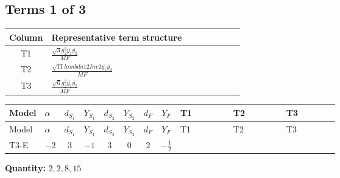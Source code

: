 \documentclass[8pt]{article}
\begin{document}
\begin{landscape}
\subsection*{Terms 1 of 3}
\begin{center}
\begin{tabular}{@{}c >{\raggedright\arraybackslash}p{0.82\linewidth}@{}}
\toprule
Column & Representative term structure \\
\midrule
T1 & \(\displaystyle \frac{\sqrt{3} g_{2}^{2} \overline{y_{1}} \overline{y_{2}}}{MF}\) \\
\midrule
T2 & \(\displaystyle \frac{\sqrt{11} lambda12Inv2 \overline{y_{1}} \overline{y_{2}}}{MF}\) \\
\midrule
T3 & \(\displaystyle \frac{\sqrt{6} g_{2}^{2} \overline{y_{1}} \overline{y_{2}}}{MF}\) \\
\midrule
\bottomrule
\end{tabular}
\end{center}
\smallskip
\tiny
\begin{longtable}{@{}llcccccc >{\raggedright\arraybackslash}p{0.21\linewidth} >{\raggedright\arraybackslash}p{0.21\linewidth} >{\raggedright\arraybackslash}p{0.21\linewidth}@{}}
\toprule
Model & $\alpha$ & $d_{S_1}$ & $Y_{S_1}$ & $d_{S_2}$ & $Y_{S_2}$ & $d_F$ & $Y_F$ & T1 & T2 & T3 \\
\midrule
\endfirsthead
\toprule
Model & $\alpha$ & $d_{S_1}$ & $Y_{S_1}$ & $d_{S_2}$ & $Y_{S_2}$ & $d_F$ & $Y_F$ & T1 & T2 & T3 \\
\midrule
\endhead
T3-E & $-2$ & $3$ & $-1$ & $3$ & $0$ & $2$ & $-\frac{1}{2}$ & \scriptsize\adjustbox{max width=\linewidth}{$\begin{gathered} - \frac{49 \sqrt{3} g_{2}^{2} \overline{y_{1}} \overline{y_{2}}}{24 MF}\end{gathered}$} & \scriptsize\adjustbox{max width=\linewidth}{$\begin{gathered} - \frac{3 \sqrt{11} lambda12Inv2 \overline{y_{1}} \overline{y_{2}}}{22 MF}\end{gathered}$} & \scriptsize\adjustbox{max width=\linewidth}{$\begin{gathered} - \frac{\sqrt{6} g_{2}^{2} \overline{y_{1}} \overline{y_{2}}}{3 MF}\end{gathered}$} \\
\midrule
\bottomrule
\end{longtable}
\clearpage
\noindent\textbf{Quantity: }$\mathrm{2,2,8,15}$\par\smallskip

\end{landscape}
\end{document}

